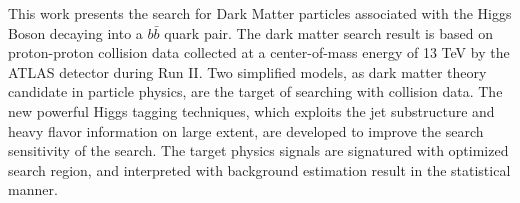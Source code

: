 This work presents the search for Dark Matter particles associated with the Higgs Boson decaying into a $b\bar{b}$ quark pair. 
The dark matter search result is based on proton-proton collision data collected at a center-of-mass energy of 13 TeV by the ATLAS detector during Run II. 
Two simplified models, as dark matter theory candidate in particle physics, are the target of searching with collision data. 
The new powerful Higgs tagging techniques, which exploits the jet substructure and heavy flavor information on large extent, are developed to improve the search sensitivity of the search. 
The target physics signals are signatured with optimized search region, and interpreted with background estimation result in the statistical manner.
